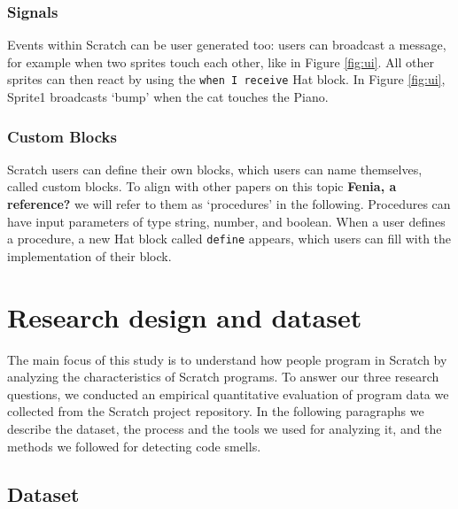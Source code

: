 \documentclass{sig-alternate}
\newcommand{\todo}[1]{\textbf{#1}}
\begin{document}
\subsubsection{Signals}
Events within Scratch can be user generated too: users can broadcast a message, for example when two sprites touch each other, like in Figure \ref{fig:ui}. All other sprites can then react by using the \texttt{when I receive} Hat block. In Figure \ref{fig:ui}, Sprite1 broadcasts `bump' when the cat touches the Piano. 

\subsubsection{Custom Blocks}
Scratch users can define their own blocks, which users can name themselves, called custom blocks. To align with other papers on this topic \todo{Fenia, a reference?} we will refer to them as `procedures' in the following. Procedures can have input parameters of type string, number, and boolean. When a user defines a procedure, a new Hat block called \texttt{define} appears, which users can fill with the implementation of their block.




\section{Research design and dataset}
\label{researchDesign}

The main focus of this study is to understand how people program in Scratch by analyzing the characteristics of Scratch programs. To answer our three research questions, we conducted an empirical quantitative evaluation of program data we collected from the Scratch project repository. In the following paragraphs we describe the dataset, the  process and the tools we used for analyzing it, and the methods we followed for detecting code smells.

\subsection{Dataset}
\label{dataset}
\end{document}
